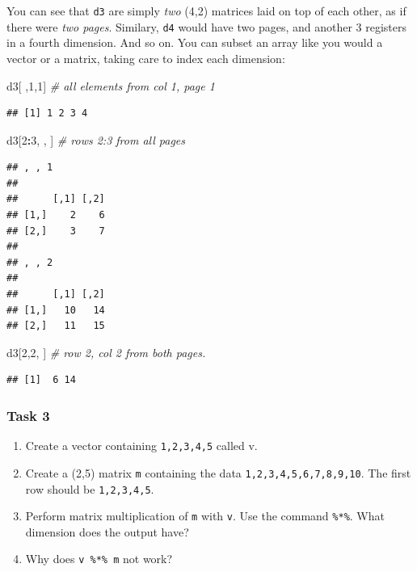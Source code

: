 \documentclass[]{book}
\newenvironment{Shaded}{\begin{snugshade}}{\end{snugshade}}
\newcommand{\DecValTok}[1]{\textcolor[rgb]{0.00,0.00,0.81}{#1}}
\newcommand{\CommentTok}[1]{\textcolor[rgb]{0.56,0.35,0.01}{\textit{#1}}}
\newcommand{\OperatorTok}[1]{\textcolor[rgb]{0.81,0.36,0.00}{\textbf{#1}}}
\newcommand{\NormalTok}[1]{#1}
\providecommand{\tightlist}{%
  \setlength{\itemsep}{0pt}\setlength{\parskip}{0pt}}
\begin{document}
You can see that \texttt{d3} are simply \emph{two} (4,2) matrices laid
on top of each other, as if there were \emph{two pages}. Similary,
\texttt{d4} would have two pages, and another 3 registers in a fourth
dimension. And so on. You can subset an array like you would a vector or
a matrix, taking care to index each dimension:

\begin{Shaded}
\begin{Highlighting}[]
\NormalTok{d3[ ,}\DecValTok{1}\NormalTok{,}\DecValTok{1}\NormalTok{]  }\CommentTok{# all elements from col 1, page 1}
\end{Highlighting}
\end{Shaded}

\begin{verbatim}
## [1] 1 2 3 4
\end{verbatim}

\begin{Shaded}
\begin{Highlighting}[]
\NormalTok{d3[}\DecValTok{2}\OperatorTok{:}\DecValTok{3}\NormalTok{, , ]  }\CommentTok{# rows 2:3 from all pages}
\end{Highlighting}
\end{Shaded}

\begin{verbatim}
## , , 1
## 
##      [,1] [,2]
## [1,]    2    6
## [2,]    3    7
## 
## , , 2
## 
##      [,1] [,2]
## [1,]   10   14
## [2,]   11   15
\end{verbatim}

\begin{Shaded}
\begin{Highlighting}[]
\NormalTok{d3[}\DecValTok{2}\NormalTok{,}\DecValTok{2}\NormalTok{, ]  }\CommentTok{# row 2, col 2 from both pages.}
\end{Highlighting}
\end{Shaded}

\begin{verbatim}
## [1]  6 14
\end{verbatim}

\subsubsection{Task 3}\label{task-3}

\begin{enumerate}
\def\labelenumi{\arabic{enumi}.}
\tightlist
\item
  Create a vector containing \texttt{1,2,3,4,5} called v.
\item
  Create a (2,5) matrix \texttt{m} containing the data
  \texttt{1,2,3,4,5,6,7,8,9,10}. The first row should be
  \texttt{1,2,3,4,5}.
\item
  Perform matrix multiplication of \texttt{m} with \texttt{v}. Use the
  command \texttt{\%*\%}. What dimension does the output have?
\item
  Why does \texttt{v\ \%*\%\ m} not work?
\end{enumerate}
\end{document}
